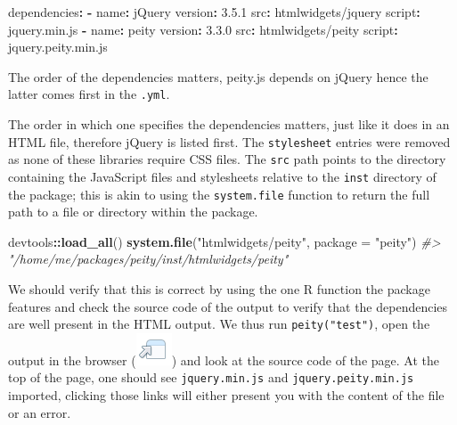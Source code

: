 \documentclass[
]{krantz}
\makeatletter
\newenvironment{Shaded}{\begin{snugshade}}{\end{snugshade}}
\newcommand{\AttributeTok}[1]{\textcolor[rgb]{0.61,0.61,0.61}{#1}}
\newcommand{\CommentTok}[1]{\textcolor[rgb]{0.37,0.37,0.37}{\textit{#1}}}
\newcommand{\DataTypeTok}[1]{\textcolor[rgb]{0.27,0.27,0.27}{#1}}
\newcommand{\FloatTok}[1]{\textcolor[rgb]{0.06,0.06,0.06}{#1}}
\newcommand{\FunctionTok}[1]{\textcolor[rgb]{0,0,0}{#1}}
\newcommand{\KeywordTok}[1]{\textcolor[rgb]{0.27,0.27,0.27}{\textbf{#1}}}
\newcommand{\NormalTok}[1]{#1}
\newcommand{\OperatorTok}[1]{\textcolor[rgb]{0.43,0.43,0.43}{\textbf{#1}}}
\newcommand{\StringTok}[1]{\textcolor[rgb]{0.5,0.5,0.5}{#1}}
\newenvironment{kframe}{%
\medskip{}
\setlength{\fboxsep}{.8em}
 \def\at@end@of@kframe{}%
 \ifinner\ifhmode%
  \def\at@end@of@kframe{\end{minipage}}%
  \begin{minipage}{\columnwidth}%
 \fi\fi%
 \def\FrameCommand##1{\hskip\@totalleftmargin \hskip-\fboxsep
 \colorbox{shadecolor}{##1}\hskip-\fboxsep
     \hskip-\linewidth \hskip-\@totalleftmargin \hskip\columnwidth}%
 \MakeFramed {\advance\hsize-\width
   \@totalleftmargin\z@ \linewidth\hsize
   \@setminipage}}%
 {\par\unskip\endMakeFramed%
 \at@end@of@kframe}
\renewenvironment{Shaded}{\begin{kframe}}{\end{kframe}}
\newenvironment{rmdblock}[1]
  {
  \begin{itemize}
  \renewcommand{\labelitemi}{
    \raisebox{-.7\height}[0pt][0pt]{
      {\setkeys{Gin}{width=3em,keepaspectratio}\texttt{[image: images/\#1]}}
    }
  }
  \setlength{\fboxsep}{1em}
  \begin{kframe}
  \item
  }
  {
  \end{kframe}
  \end{itemize}
  }
\newenvironment{rmdnote}
  {\begin{rmdblock}{note}}
  {\end{rmdblock}}
\makeatother
\begin{document}
\begin{Shaded}
\begin{Highlighting}[]
\FunctionTok{dependencies}\KeywordTok{:}
\AttributeTok{  }\KeywordTok{{-}}\AttributeTok{ }\FunctionTok{name}\KeywordTok{:}\AttributeTok{ jQuery}
\AttributeTok{    }\FunctionTok{version}\KeywordTok{:}\AttributeTok{ }\FloatTok{3.5.1}
\AttributeTok{    }\FunctionTok{src}\KeywordTok{:}\AttributeTok{ htmlwidgets/jquery}
\AttributeTok{    }\FunctionTok{script}\KeywordTok{:}\AttributeTok{ jquery.min.js}
\AttributeTok{  }\KeywordTok{{-}}\AttributeTok{ }\FunctionTok{name}\KeywordTok{:}\AttributeTok{ peity}
\AttributeTok{    }\FunctionTok{version}\KeywordTok{:}\AttributeTok{ }\FloatTok{3.3.0}
\AttributeTok{    }\FunctionTok{src}\KeywordTok{:}\AttributeTok{ htmlwidgets/peity}
\AttributeTok{    }\FunctionTok{script}\KeywordTok{:}\AttributeTok{ jquery.peity.min.js}
\end{Highlighting}
\end{Shaded}

\begin{rmdnote}
The order of the dependencies matters, peity.js depends on jQuery hence
the latter comes first in the \texttt{.yml}.
\end{rmdnote}

The order in which one specifies the dependencies matters, just like it does in an HTML file, therefore jQuery is listed first. The \texttt{stylesheet} entries were removed as none of these libraries require CSS files. The \texttt{src} path points to the directory containing the JavaScript files and stylesheets relative to the \texttt{inst} directory of the package; this is akin to using the \texttt{system.file} function to return the full path to a file or directory within the package.

\begin{Shaded}
\begin{Highlighting}[]
\NormalTok{devtools}\OperatorTok{::}\KeywordTok{load\_all}\NormalTok{()}
\KeywordTok{system.file}\NormalTok{(}\StringTok{"htmlwidgets/peity"}\NormalTok{, }\DataTypeTok{package =} \StringTok{"peity"}\NormalTok{)                                         }
\CommentTok{\#> "/home/me/packages/peity/inst/htmlwidgets/peity"}
\end{Highlighting}
\end{Shaded}

We should verify that this is correct by using the one R function the package features and check the source code of the output to verify that the dependencies are well present in the HTML output. We thus run \texttt{peity("test")}, open the output in the browser (\includegraphics{images/open-in-browser.png}) and look at the source code of the page. At the top of the page, one should see \texttt{jquery.min.js} and \texttt{jquery.peity.min.js} imported, clicking those links will either present you with the content of the file or an error.
\end{document}
